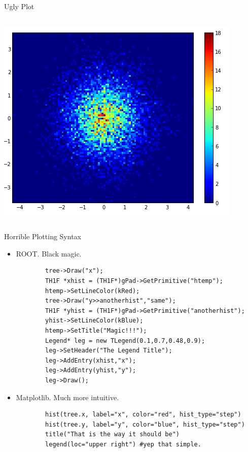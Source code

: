 \documentclass{beamer}
\begin{document}
\begin{frame}{Ugly Plot}
\begin{columns}
\begin{column}{0.4\textwidth}
		\includegraphics[width=\textwidth]{pic/hist2d-matplotlib.png}

	\end{column}
	\end{columns}
\end{frame}

\begin{frame}[fragile]{Horrible Plotting Syntax}
	\begin{itemize}
	\item ROOT. Black magic.
	\begin{verbatim}
		tree->Draw("x");
		TH1F *xhist = (TH1F*)gPad->GetPrimitive("htemp");
		htemp->SetLineColor(kRed);
		tree->Draw("y>>anotherhist","same");
		TH1F *yhist = (TH1F*)gPad->GetPrimitive("anotherhist");
		yhist->SetLineColor(kBlue);
		htemp->SetTitle("Magic!!!");
		Legend* leg = new TLegend(0.1,0.7,0.48,0.9);
		leg->SetHeader("The Legend Title");
		leg->AddEntry(xhist,"x");
		leg->AddEntry(yhist,"y");
		leg->Draw();
	\end{verbatim}
	\item Matplotlib. Much more intuitive.
		\begin{verbatim}
		hist(tree.x, label="x", color="red", hist_type="step")
		hist(tree.y, label="y", color="blue", hist_type="step")
		title("That is the way it should be")
		legend(loc="upper right") #yep that simple.
		\end{verbatim}
	\end{itemize}
\end{frame}
\end{document}
